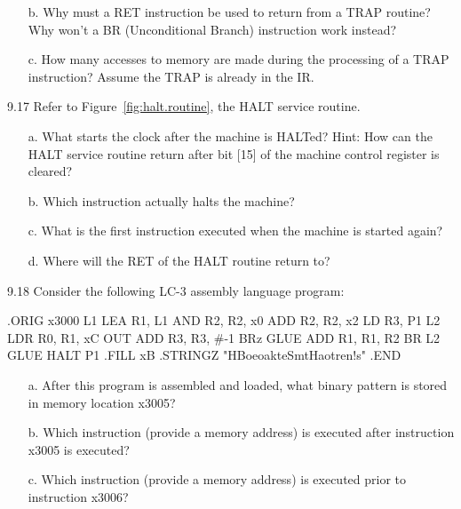 \documentclass{patt}
\begin{document}
\begin{exercises}
\begin{enumerate}[a.]
\item[b.] Why must a RET instruction be used to return from a TRAP routine?
Why won't a BR (Unconditional Branch) instruction work instead?

\item[c.] How many accesses to memory are made during the processing of a TRAP
instruction?  Assume the TRAP is already in the IR.
\end{enumerate}

\item[9.17] Refer to Figure~\ref{fig:halt.routine}, the HALT service
routine.
\begin{enumerate}[a.]
\item[a.] What starts the clock after the machine is HALTed?
Hint: How can the HALT service routine return
after bit [15] of the machine control register is cleared?

\item[b.] Which instruction actually halts the machine?

\item[c.] What is the first instruction executed when the machine is started again?

\item[d.] Where will the RET of the HALT routine return to?
\end{enumerate}

\item[9.18] Consider the following LC-3 assembly language program:
\begin{colorverbatim}
                .ORIG   x3000
        L1      LEA     R1, L1
                AND     R2, R2, x0
                ADD     R2, R2, x2
                LD      R3, P1
        L2      LDR     R0, R1, xC
                OUT
                ADD     R3, R3, #-1
                BRz     GLUE
                ADD     R1, R1, R2
                BR      L2
        GLUE    HALT
        P1      .FILL   xB
                .STRINGZ "HBoeoakteSmtHaotren!s"
                .END
\end{colorverbatim}
\begin{enumerate}[a.]
\item[a.] After this program is assembled and loaded, what binary
  pattern is stored in memory location x3005?

\item[b.] Which instruction (provide a memory address) is executed
  after instruction x3005 is executed?

\item[c.] Which instruction (provide a memory address) is executed
  prior to instruction x3006?


\end{enumerate}
\end{exercises}
\end{document}

